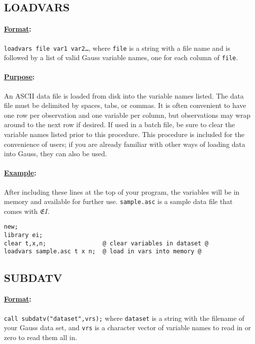 \documentclass[11pt,titlepage]{article}
\newcommand{\EI}{\ensuremath{{\mathfrak EI}}}
\begin{document}
\subsection{LOADVARS}  \label{loadvars}

\paragraph{\underline{Format}:} \texttt{loadvars file var1
  var2\ldots}, where \texttt{file} is a string with a file name and is
followed by a list of valid Gauss variable names, one for each column
of \texttt{file}.

\paragraph{\underline{Purpose}:}
An ASCII data file is loaded from disk into the variable names listed.
The data file must be delimited by spaces, tabs, or commas.  It is
often convenient to have one row per observation and one variable per
column, but observations may wrap around to the next row if desired.
If used in a batch file, be sure to clear the variable names listed
prior to this procedure.  This procedure is included for the
convenience of users; if you are already familiar with other ways of
loading data into Gauss, they can also be used.

\paragraph{\underline{Example}:}
After including these lines at the top of your program, the variables
will be in memory and available for further use.  \texttt{sample.asc}
is a sample data file that comes with \EI.
\begin{verbatim}
new;
library ei;
clear t,x,n;                @ clear variables in dataset @
loadvars sample.asc t x n;  @ load in vars into memory @
\end{verbatim}

\subsection{SUBDATV}\label{subdatv}

\paragraph{\underline{Format}:} \texttt{call subdatv("dataset",vrs);} where
\texttt{dataset} is a string with the filename of your Gauss data set,
and \texttt{vrs} is a character vector of variable names to read in or
zero to read them all in.
\end{document}
